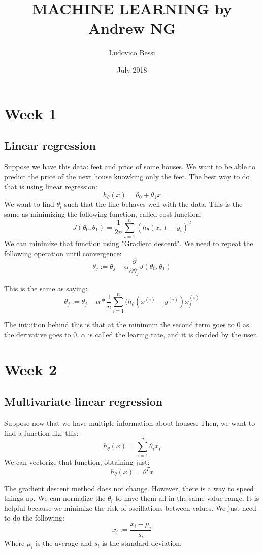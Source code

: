 \documentclass{article}
\title{\LARGE MACHINE LEARNING by Andrew NG}
\author{Ludovico Bessi}
\date{July 2018}
\begin{document}
\maketitle
\tableofcontents
\section{Week 1}
\subsection{Linear regression}
Suppose we have this data: feet and price of some houses. We want to be able to
predict the price of the next house knowking only the feet. The best way to do
that is using linear regression: $$ h_\theta(x) = \theta_0 + \theta_1 x $$
We want to find $\theta_i$ such that the line behaves well with the data.
This is the same as minimizing the following function, called cost function:
$$ J(\theta_0,\theta_1) = \frac{1}{2n}\sum_{i=1}^{n}(h_\theta(x_i) - y_i)^2$$
We can minimize that function using "Gradient descent".
We need to repeat the following operation until convergence:
$$ \theta_j := \theta_j -\alpha \frac{\partial}{\partial \theta_j}
J(\theta_0,\theta_1)$$

This is the same as saying:
$$ \theta_j := \theta_j - \alpha*\frac{1}{n}\sum_{i=1}^{n}(h_\theta(x^{(i)} - y^{(i)})x_j^{(i)}$$

The intuition behind this is that at the minimum the second term goes to 0 as
the derivative goes to 0. $\alpha$ is called the learnig rate, and it is decided
by the user.
\newpage


\section{Week 2}
\subsection{Multivariate linear regression}
Suppose now that we have multiple information about houses.
Then, we want to find a function like this:
$$ h_\theta(x) = \sum_{i=1}^{n} \theta_i x_i $$
We can vectorize that function, obtaining just:
$$ h_\theta(x) = \theta^T x $$

The gradient descent method does not change. However, there is a way to speed
things up. We can normalize the $\theta_i$ to have them all in the same value
range. It is helpful because we minimize the risk of oscillations between values.
We just need to do the following:
$$ x_i := \frac{x_i - \mu_i}{s_i} $$
Where $\mu_i$ is the average and $s_i$ is the standard deviation.
\end{document}
